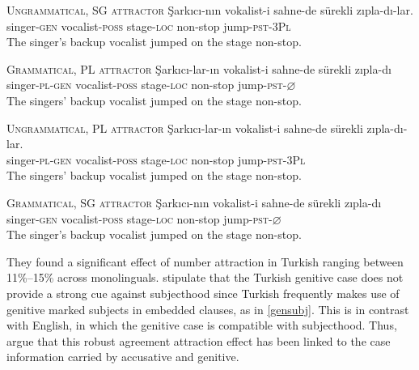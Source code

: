 \documentclass[doc]{apa6}
\begin{document}
\begin{exe}
\ex
\begin{xlist}

\ex \textsc{Ungrammatical, SG attractor} \label{lago4}
\gll \c{S}ark{\i}c{\i}-n{\i}n vokalist-i sahne-de s\"{u}rekli z{\i}pla-d{\i}-lar.\\
singer-\textsc{gen} vocalist-\textsc{poss} stage-\textsc{loc} non-stop jump-\textsc{pst}-\textsc{3Pl}\\
\glt The singer's backup vocalist jumped on the stage non-stop.

\ex \textsc{Grammatical, PL attractor} \label{lago2}
\gll \c{S}ark{\i}c{\i}-lar-{\i}n vokalist-i sahne-de s\"{u}rekli z{\i}pla-d{\i}\\
singer-\textsc{pl}-\textsc{gen} vocalist-\textsc{poss} stage-\textsc{loc} non-stop jump-\textsc{pst}-$\varnothing$\\
\glt The singers' backup vocalist jumped on the stage non-stop.


\ex \textsc{Ungrammatical, PL attractor} \label{lago3}
\gll \c{S}ark{\i}c{\i}-lar-{\i}n vokalist-i sahne-de s\"{u}rekli z{\i}pla-d{\i}-lar.\\
singer-\textsc{pl}-\textsc{gen} vocalist-\textsc{poss} stage-\textsc{loc} non-stop jump-\textsc{pst}-\textsc{3Pl}\\
\glt The singers' backup vocalist jumped on the stage non-stop.

\ex \textsc{Grammatical, SG attractor} \label{lago1}
\gll \c{S}ark{\i}c{\i}-n{\i}n vokalist-i sahne-de s\"{u}rekli z{\i}pla-d{\i}\\
singer-\textsc{gen} vocalist-\textsc{poss} stage-\textsc{loc} non-stop jump-\textsc{pst}-$\varnothing$\\
\glt The singer's backup vocalist jumped on the stage non-stop.

\end{xlist}
\end{exe}

They found a significant effect of number attraction in Turkish ranging between 11\%--15\% across monolinguals. \textcite{Lago2018} stipulate that the Turkish genitive case does not provide a strong cue against subjecthood since Turkish frequently makes use of genitive marked subjects in embedded clauses, as in \autoref{gensubj}. This is in contrast with English, in which the genitive case is compatible with subjecthood. Thus, \textcite{Lago2018} argue that this robust agreement attraction effect has been linked to the case information carried by accusative and genitive.
\end{document}
